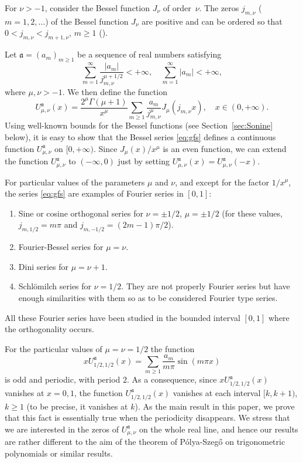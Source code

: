 \documentclass[10pt,a4paper]{article}
\numberwithin{equation}{section}
\theoremstyle{plain}
\theoremstyle{definition}
\newcommand{\aA}{\mathfrak{a}}
\begin{document}
For $\nu>-1$, consider the Bessel function $J_\nu$ of order~$\nu$. The zeros $j_{m,\nu}$ ($m=1,2,\dots$) of the Bessel function $J_{\nu}$ are positive and can be ordered so that $0<j_{m,\nu}< j_{m+1,\nu}$, $m\ge 1$ (\cite[\S\,15.27, p.~483]{Wat}).

Let $\aA=(a_m)_{m\ge 1}$ be a sequence of real numbers satisfying
\begin{equation}
\label{eq:pcs}
   \sum _{m=1}^\infty \frac{|a_m|}{j_{m,\nu}^{\mu+1/2}} < +\infty,
   \quad
   \sum _{m=1}^\infty |a_m| < +\infty,
\end{equation}
where $\mu,\nu>-1$. We then define the function
\begin{equation}
\label{eq:gfs}
   U_{\mu,\nu}^{\aA}(x) = \frac{2^\mu\Gamma(\mu+1)}{x^\mu}
   \sum_{m\ge 1} \frac{a_m}{j_{m,\nu}^\mu}J_\mu (j_{m,\nu} x),
   \quad x\in (0,+\infty).
\end{equation}
Using well-known bounds for the Bessel functions (see Section~\ref{sec:Sonine} below), it is easy to show that the Bessel series \eqref{eq:gfs} defines a continuous function $U_{\mu,\nu}^\aA$ on $[0,+\infty)$. Since $J_\mu(x)/x^\mu$ is an even function, we can
extend the function $U_{\mu,\nu}^\aA$ to $(-\infty,0)$ just by setting $U_{\mu,\nu}^\aA(x)=U_{\mu,\nu}^\aA(-x)$.

For particular values of the parameters $\mu$ and $\nu$, and except for the factor $1/x^\mu$, the series \eqref{eq:gfs} are examples of Fourier series in $[0,1]$:
\begin{enumerate}
\item Sine or cosine orthogonal series for $\nu=\pm 1/2$, $\mu=\pm 1/2$ (for these values, $j_{m,1/2}=m\pi$ and $j_{m,-1/2} = (2m-1)\pi/2$).
\item Fourier-Bessel series for $\mu=\nu$.
\item Dini series for $\mu=\nu+1$.
\item Schl\"{o}milch series for $\nu=1/2$. They are not properly Fourier series but have enough similarities with them so as to be considered Fourier type series.
\end{enumerate}
All these Fourier series have been studied in the bounded interval $[0,1]$ where the orthogonality occurs.

For the particular values of $\mu=\nu=1/2$ the function
\begin{equation}
\label{eq:funu}
   xU_{1/2,1/2}^\aA(x) = \sum_{m\ge 1} \frac{a_m}{m\pi}\sin(m\pi x)
\end{equation}
is odd and periodic, with period $2$. As a consequence, since $xU_{1/2,1/2}^\aA(x)$ vanishes at $x=0,1$, the function $U_{1/2,1/2}^\aA(x)$ vanishes at each interval $[k,k+1)$, $k\ge 1$ (to be precise, it vanishes at $k$). As the main result in this paper, we prove that this fact is essentially true when
the periodicity disappears.
We stress that we are interested in the zeros of $U_{\mu,\nu}^\aA$ on the whole real line, and hence our results are rather different to the aim of the theorem of P\'olya-Szeg\H{o} on trigonometric polynomials \cite[Th.~6.4, p.~134]{Sz} or similar results.
\end{document}
